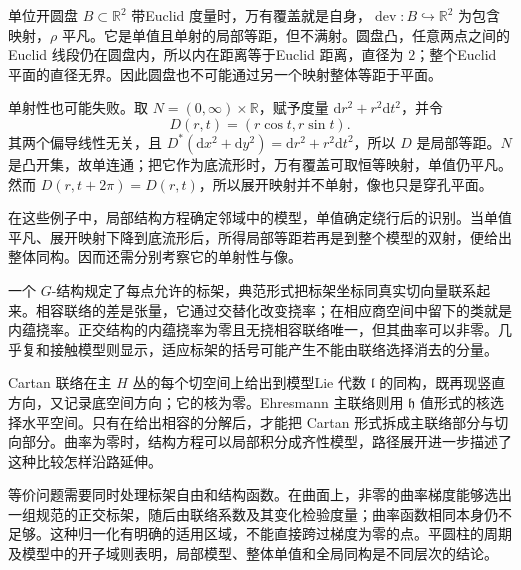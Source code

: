 \begin{example}\label{g1:exm:trivial-monodromy-incomplete-model}
	单位开圆盘 \(B\subset\mathbb R^2\) 带Euclid 度量时，万有覆盖就是自身，\(\operatorname{dev}:B\hookrightarrow\mathbb R^2\) 为包含映射，\(\rho\) 平凡。它是单值且单射的局部等距，但不满射。圆盘凸，任意两点之间的Euclid 线段仍在圆盘内，所以内在距离等于Euclid 距离，直径为 \(2\)；整个Euclid 平面的直径无界。因此圆盘也不可能通过另一个映射整体等距于平面。

	单射性也可能失败。取 \(N=(0,\infty)\times\mathbb R\)，赋予度量 \(\mathrm{d}r^2+r^2\mathrm{d}t^2\)，并令
	\[
		D(r,t)=(r\cos t,r\sin t).
	\]
	其两个偏导线性无关，且 \(D^*(\mathrm{d}x^2+\mathrm{d}y^2)=\mathrm{d}r^2+r^2\mathrm{d}t^2\)，所以 \(D\) 是局部等距。\(N\) 是凸开集，故单连通；把它作为底流形时，万有覆盖可取恒等映射，单值仍平凡。然而 \(D(r,t+2\pi)=D(r,t)\)，所以展开映射并不单射，像也只是穿孔平面。
\end{example}

在这些例子中，局部结构方程确定邻域中的模型，单值确定绕行后的识别。当单值平凡、展开映射下降到底流形后，所得局部等距若再是到整个模型的双射，便给出整体同构。因而还需分别考察它的单射性与像。

\begin{chaptersummary}
	一个 \(G\)-结构规定了每点允许的标架，典范形式把标架坐标同真实切向量联系起来。相容联络的差是张量，它通过交替化改变挠率；在相应商空间中留下的类就是内蕴挠率。正交结构的内蕴挠率为零且无挠相容联络唯一，但其曲率可以非零。几乎复和接触模型则显示，适应标架的括号可能产生不能由联络选择消去的分量。

	\ProseParagraphBreak

	Cartan 联络在主 \(H\) 丛的每个切空间上给出到模型Lie 代数 \(\mathfrak l\) 的同构，既再现竖直方向，又记录底空间方向；它的核为零。Ehresmann 主联络则用 \(\mathfrak h\) 值形式的核选择水平空间。只有在给出相容的分解后，才能把 Cartan 形式拆成主联络部分与切向部分。曲率为零时，结构方程可以局部积分成齐性模型，路径展开进一步描述了这种比较怎样沿路延伸。

	\ProseParagraphBreak

	等价问题需要同时处理标架自由和结构函数。在曲面上，非零的曲率梯度能够选出一组规范的正交标架，随后由联络系数及其变化检验度量；曲率函数相同本身仍不足够。这种归一化有明确的适用区域，不能直接跨过梯度为零的点。平圆柱的周期及模型中的开子域则表明，局部模型、整体单值和全局同构是不同层次的结论。
\end{chaptersummary}

\BookExercises

